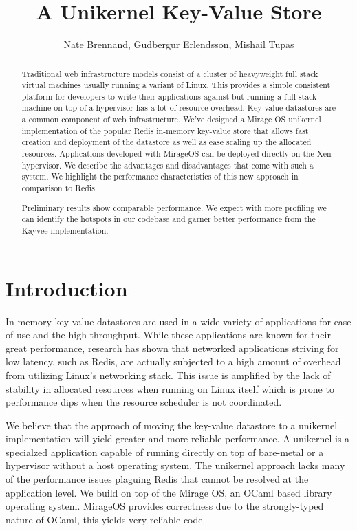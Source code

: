 \documentclass[english,10pt,twocolumn]{article}
\begin{document}
\title{A Unikernel Key-Value Store}
\author{Nate Brennand, Gudbergur Erlendsson, Mishail Tupas}
\date{}
\maketitle
\thispagestyle{empty}


\begin{abstract}
Traditional web infrastructure models consist of a cluster of heavyweight full stack virtual machines usually running a variant of Linux.
This provides a simple consistent platform for developers to write their applications against but running a full stack machine on top of a hypervisor has a lot of resource overhead.
Key-value datastores are a common component of web infrastructure.
We've designed a Mirage OS\cite{mirage} unikernel implementation of the popular Redis\cite{redis} in-memory key-value store that allows fast creation and deployment of the datastore as well as ease scaling up the allocated resources.
Applications developed with MirageOS can be deployed directly on the Xen hypervisor.
We describe the advantages and disadvantages that come with such a system.
We highlight the performance characteristics of this new approach in comparison to Redis.

Preliminary results show comparable performance.
We expect with more profiling we can identify the hotspots in our codebase and garner better performance from the Kayvee implementation.
\end{abstract}


\section{Introduction}
In-memory key-value datastores are used in a wide variety of applications for ease of use and the high throughput.
While these applications are known for their great performance, research has shown that networked applications striving for low latency, such as Redis, are actually subjected to a high amount of overhead from utilizing Linux's networking stack.\cite{arrakis}
This issue is amplified by the lack of stability in allocated resources when running on Linux itself which is prone to performance dips when the resource scheduler is not coordinated.

We believe that the approach of moving the key-value datastore to a unikernel implementation will yield greater and more reliable performance.
A unikernel is a specialzed application capable of running directly on top of bare-metal or a hypervisor without a host operating system.
The unikernel approach lacks many of the performance issues plaguing Redis that cannot be resolved at the application level.
We build on top of the Mirage OS\cite{mirage}, an OCaml based library operating system.
MirageOS provides correctness due to the strongly-typed nature of OCaml, this yields very reliable code.
\end{document}
